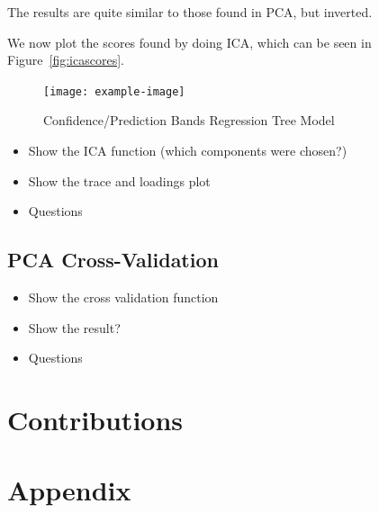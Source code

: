 \documentclass[a4paper, twocolumn]{article}
\begin{document}
    The results are quite similar to those found in PCA, but inverted.

    We now plot the scores found by doing ICA, which can be seen in Figure~\ref{fig:icascores}.

    \begin{figure}[h!]
        \centering
        \caption{Confidence/Prediction Bands Regression Tree Model}
        \label{fig:icascores.eps}
        \texttt{[image: example-image]}
    \end{figure}

    \begin{itemize}
        \item Show the ICA function (which components were chosen?)
        \item Show the trace and loadings plot
        \item Questions
    \end{itemize}
    \subsection*{PCA Cross-Validation}
    \begin{itemize}
        \item Show the cross validation function
        \item Show the result?
        \item Questions
    \end{itemize}

    \section*{Contributions}

    \nocite{*} %
    
    
    \onecolumn \appendix
    \section*{Appendix}
\end{document}
